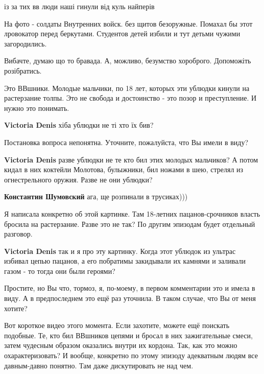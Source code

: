 із за тих вв люди наші гинули від куль найперів


На фото - солдаты Внутренних войск. без щитов безоружные. Помахал бы этот
лровокатор перед беркутами. Студентов детей избили и тут детьми чужими
загородились.


Вибачте, думаю що то бравада. А, можливо, безумство хороброго. Допоможіть
розібратись.


Это ВВшники. Молодые мальчики, по 18 лет, которых эти ублюдки кинули на
растерзание толпы. Это не свобода и достоинство - это позор и преступление. И
нужно это понимать.

\begin{itemize} %
\textbf{Victoria Denis} хіба ублюдки не ті хто їх бив?

Постановка вопроса непонятна. Уточните, пожалуйста, что Вы имели в виду?

\textbf{Victoria Denis} разве ублюдки не те кто бил этих молодых мальчиков? А потом кидал в них коктейли Молотова, булыжники, бил ножами в шею, стрелял из огнестрельного оружия. Разве не они ублюдки?

\textbf{Константин Шумовский} ага, ще розпинали в трусиках)))

Я написала конкретно об этой картинке. Там 18-летних пацанов-срочников власть бросила на растерзание. Разве это не так? По другим эпизодам будет отдельный разговор.

\textbf{Victoria Denis} так и я про эту картинку. Когда этот ублюдок из ультрас избивал цепью пацанов, а его побратимы закидывали их камнями и заливали газом - то тогда они были героями?


Простите, но Вы что, тормоз, я, по-моему, в первом комментарии это и имела в
виду. А в предпоследнем это ещё раз уточнила. В таком случае, что Вы от меня
хотите?


Вот короткое видео этого момента. Если захотите, можете ещё поискать подобные.
Те, кто бил ВВшников цепями и бросал в них зажигательные смеси, затем чудесным
образом оказались внутри их кордона. Так, как это можно охарактеризовать? И
вообще, конкретно по этому эпизоду адекватным людям все давным-давно понятно.
Там даже дискутировать не над чем.


\end{itemize}
